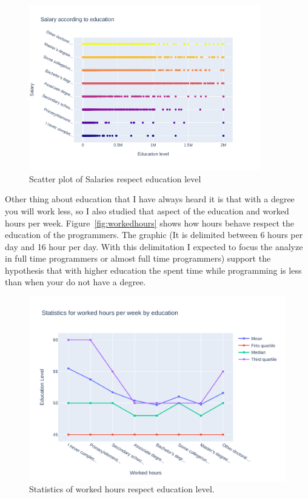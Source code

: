 \documentclass{article}
\begin{document}
\begin{figure}[ht]
    \centering
    \includegraphics[width=0.9\textwidth]{images/salary_EdLevel.pdf}
    \caption{Scatter plot of Salaries respect education level}
    \label{fig:salariesedlevelscatter}
\end{figure}

Other thing about education that I have always heard it is that with a degree you will work less, so I also studied that aspect of the education and worked hours per week. Figure~\ref{fig:workedhours} shows how hours behave respect the education of the programmers. The graphic (It is delimited between 6 hours per day and 16 hour per day. With this delimitation I expected to focus the analyze in full time programmers or almost full time programmers) support the hypothesis that with higher education the spent time while programming is less than when your do not have a degree.

    \begin{figure}[ht]
        \centering
        \includegraphics[height=0.4\textheight]{images/statistics_hours.pdf}
        \caption{Statistics of worked hours respect education level.}
        \label{fig:statisticshours}
    \end{figure}
\end{document}
